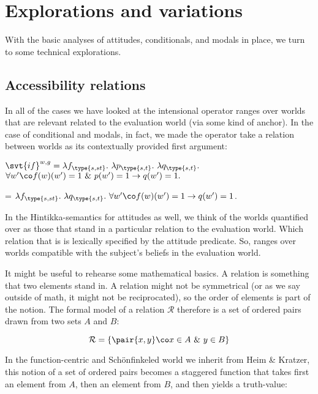 \section{Explorations and variations}
\label{sec:variations}

With the basic analyses of attitudes, conditionals, and modals in place, we turn
to some technical explorations.

\subsection{Accessibility relations}
\label{sec:accessibility}

In all of the cases we have looked at the intensional operator ranges over
worlds that are relevant related to the evaluation world (via some kind of
anchor). In the case of conditional and modals, in fact, we made the operator
take a relation between worlds as its contextually provided first
argument:

\ex%
$\svt{if}^{w,g} = \lambda f_{\type{s,st}}.\ \lambda p_{\type{s,t}}.\
\lambda q_{\type{s,t}}.$ \\
\hfill $\forall w'\co f(w)(w') = 1\ \&\ p(w')=1 \rightarrow q(w')=1.$ \xe

\ex {} =
$\lambda f_{\type{s,st}}.\ \lambda q_{\type{s,t}}.\ \forall w'\co f(w)(w')
=1 \rightarrow q(w')=1$. \xe

\enlargethispage{24pt}
In the Hintikka-semantics for attitudes as well, we think of the worlds
quantified over as those that stand in a particular relation to the evaluation
world. Which relation that is is lexically specified by the attitude predicate.
So, \expression{believe} ranges over worlds compatible with the subject's
beliefs in the evaluation world.

It might be useful to rehearse some mathematical basics. A relation is something
that two elements stand in. A relation might not be symmetrical (or as we say
outside of math, it might not be reciprocated), so the order of elements is part
of the notion. The formal model of a relation $\mathcal{R}$ therefore is a set
of ordered pairs drawn from two sets $A$ and $B$:

\[\mathcal{R} = \{\pair{x,y}\co x\in A\ \&\ y\in B\}\]

In the function-centric and Schönfinkeled world we inherit from Heim \& Kratzer,
this notion of a set of ordered pairs becomes a staggered function that takes
first an element from $A$, then an element from $B$, and then yields a
truth-value:


